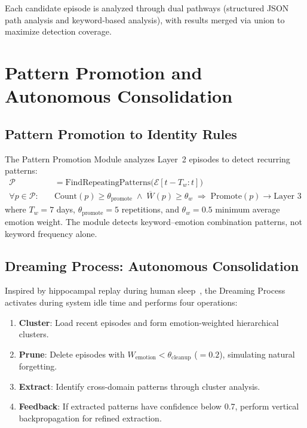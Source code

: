 \documentclass[11pt,a4paper]{article}
\begin{document}
Each candidate episode is analyzed through dual pathways (structured JSON path analysis and keyword-based analysis), with results merged via union to maximize detection coverage.

\section{Pattern Promotion and Autonomous Consolidation}

\subsection{Pattern Promotion to Identity Rules}

The Pattern Promotion Module analyzes Layer~2 episodes to detect recurring patterns:
\begin{align}
  \mathcal{P} &= \text{FindRepeatingPatterns}\!\bigl(\mathcal{E}[t - T_w : t]\bigr) \\
  \forall p \in \mathcal{P}:\quad &
    \text{Count}(p) \ge \theta_{\text{promote}}
    \;\wedge\;
    \overline{W}(p) \ge \theta_w
    \;\Rightarrow\;
    \text{Promote}(p) \to \text{Layer~3}
\end{align}
where $T_w = 7$ days, $\theta_{\text{promote}} = 5$ repetitions, and $\theta_w = 0.5$ minimum average emotion weight. The module detects keyword--emotion combination patterns, not keyword frequency alone.

\subsection{Dreaming Process: Autonomous Consolidation}

Inspired by hippocampal replay during human sleep~\citep{walker2004sleep,diekelmann2010memory}, the Dreaming Process activates during system idle time and performs four operations:

\begin{enumerate}[leftmargin=*, itemsep=2pt]
  \item \textbf{Cluster}: Load recent episodes and form emotion-weighted hierarchical clusters.
  \item \textbf{Prune}: Delete episodes with $W_{\text{emotion}} < \theta_{\text{cleanup}}$ ($= 0.2$), simulating natural forgetting.
  \item \textbf{Extract}: Identify cross-domain patterns through cluster analysis.
  \item \textbf{Feedback}: If extracted patterns have confidence below 0.7, perform vertical backpropagation for refined extraction.
\end{enumerate}
\end{document}
